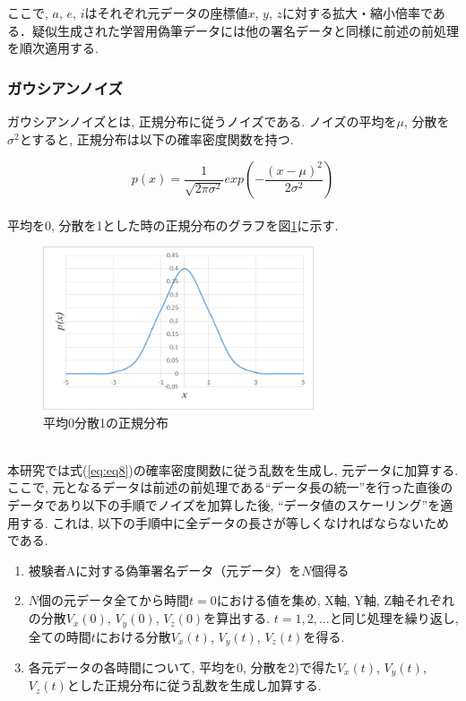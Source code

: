 \noindent
ここで, $a$, $e$, $i$はそれぞれ元データの座標値$x$, $y$, $z$に対する拡大・縮小倍率である．疑似生成された学習用偽筆データには他の署名データと同様に前述の前処理を順次適用する.\\

\subsubsection{ガウシアンノイズ}

ガウシアンノイズとは, 正規分布に従うノイズである. ノイズの平均を$\mu$, 分散を$\sigma^2$とすると, 正規分布は以下の確率密度関数を持つ.

\begin{equation}
p(x) = \frac{1}{\sqrt{2\pi\sigma^2}}exp\left(-\frac{(x-\mu)^2}{2\sigma^2}\right)　\label{eq:eq8}
\end{equation}\\

\noindent
平均を0, 分散を1とした時の正規分布のグラフを図\ref{fig:GaussDist}に示す.
\\
\begin{figure}[htbp]
  \begin{center}
    \includegraphics[clip,width=8.0cm]{./images/GaussDist.png}
    \caption{平均0分散1の正規分布}
    \label{fig:GaussDist}
  \end{center}
\end{figure}\\

\noindent
本研究では式(\ref{eq:eq8})の確率密度関数に従う乱数を生成し, 元データに加算する. ここで, 元となるデータは前述の前処理である“データ長の統一”を行った直後のデータであり以下の手順でノイズを加算した後, “データ値のスケーリング”を適用する. これは, 以下の手順中に全データの長さが等しくなければならないためである.\\
\begin{enumerate}
  \item 被験者Aに対する偽筆署名データ（元データ）を$N$個得る
  \item $N$個の元データ全てから時間$t = 0$における値を集め, X軸, Y軸, Z軸それぞれの分散$V_x(0)$, $V_y(0)$, $V_z(0)$を算出する. $t = 1, 2, ...$と同じ処理を繰り返し, 全ての時間$t$における分散$V_x(t)$, $V_y(t)$, $V_z(t)$を得る.
  \item 各元データの各時間について, 平均を0, 分散を2)で得た$V_x(t)$, $V_y(t)$, $V_z(t)$とした正規分布に従う乱数を生成し加算する.\\
\end{enumerate}


